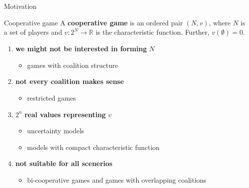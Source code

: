 \documentclass{beamer}
\begin{document}
\begin{frame}{Motivation}
    \begin{block}{Cooperative game}
        A \textbf{cooperative game} is an ordered pair $(N,v)$, where $N$ is a set of players and $v\colon 2^N \to \mathbb{R}$ is the characteristic function. Further, $v(\emptyset) = 0$.
    \end{block}
	\begin{enumerate}
		\item \textbf{we might not be interested in forming} $N$
		\begin{itemize}
			\item games with coalition structure
		\end{itemize}
		\item \textbf{not every coalition makes sense}
		\begin{itemize}
			\item restricted games
		\end{itemize}
		\item $2^n$ \textbf{real values representing} $v$
		\begin{itemize}
			\item uncertainty models
			\item models with compact characteristic function
		\end{itemize}
		\item \textbf{not suitable for all scenerios}
		\begin{itemize}
			\item bi-cooperative games and games with overlapping coalitions
		\end{itemize}
	\end{enumerate}
\end{frame}

\end{document}
